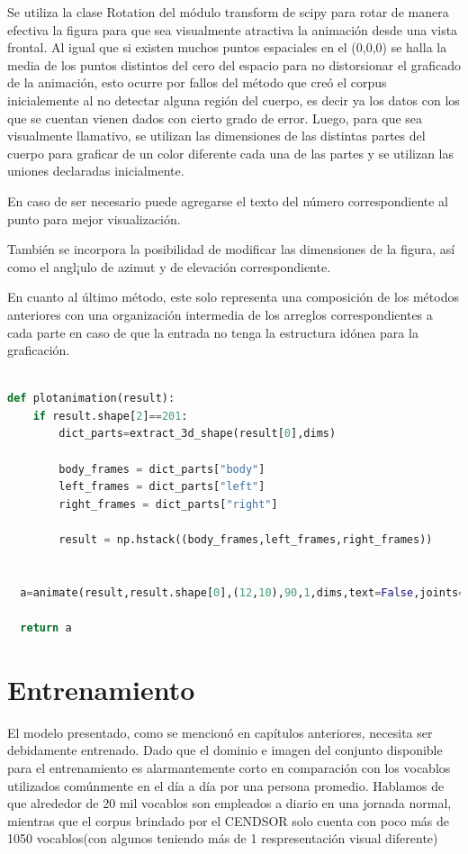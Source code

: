 Se utiliza la clase Rotation del módulo transform de scipy para rotar de manera efectiva la figura para que sea visualmente atractiva la animación desde una vista frontal. Al igual que si existen muchos puntos espaciales en el (0,0,0) se halla la media de los puntos distintos del cero del espacio para no distorsionar el graficado de la animación, esto ocurre por fallos del método que creó el corpus inicialemente al no detectar alguna región del cuerpo, es decir ya los datos con los que se cuentan vienen dados con cierto grado de error.
Luego, para que sea visualmente llamativo, se utilizan las dimensiones de las distintas partes del cuerpo para graficar de un color diferente cada una de las partes y se utilizan las uniones declaradas inicialmente. 

En caso de ser necesario puede agregarse el texto del número correspondiente al punto para mejor visualización.

También se incorpora la posibilidad de modificar las dimensiones de la figura, así como el angl¡ulo de azimut y de elevación correspondiente.


En cuanto al último método, este solo representa una composición de los métodos anteriores con una organización intermedia de los arreglos correspondientes a cada parte en caso de que la entrada no tenga la estructura idónea para la graficación.

\begin{lstlisting}[language=Python, caption={Graficar la animación }]
  
def plotanimation(result):
	if result.shape[2]==201:
  		dict_parts=extract_3d_shape(result[0],dims)
      
  		body_frames = dict_parts["body"]
  		left_frames = dict_parts["left"]
  		right_frames = dict_parts["right"]

  		result = np.hstack((body_frames,left_frames,right_frames))
  		

  a=animate(result,result.shape[0],(12,10),90,1,dims,text=False,joints=True)
  
  return a
\end{lstlisting}

\section{Entrenamiento}
El modelo presentado, como se mencionó en capítulos anteriores, necesita ser debidamente entrenado. Dado que el dominio e imagen del conjunto disponible para el entrenamiento es alarmantemente corto en comparación con los vocablos utilizados comúnmente en el día a día por una persona promedio. Hablamos de que alrededor de 20 mil vocablos son empleados a diario en una jornada normal, mientras que el corpus brindado por el CENDSOR solo cuenta con poco más de 1050 vocablos(con algunos teniendo más de 1 respresentación visual diferente)

